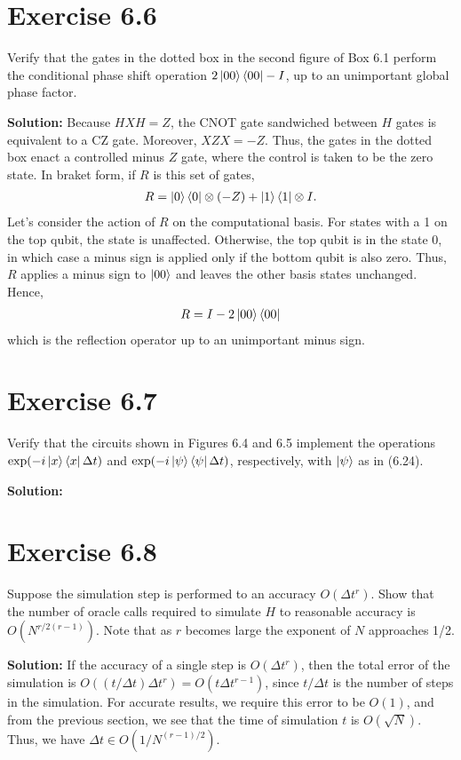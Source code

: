 \documentclass{book}
\begin{document}
    \section*{Exercise 6.6} 
        Verify that the gates in the dotted box in the second figure of Box 6.1 perform the conditional phase shift operation $2\ket{00}\bra{00}-I$, up to an unimportant global phase factor.
        
        \textbf{Solution:} Because $HXH = Z$, the CNOT gate sandwiched between $H$ gates is equivalent to a CZ gate. Moreover, $XZX = -Z$. Thus, the gates in the dotted box enact a controlled minus $Z$ gate, where the control is taken to be the zero state. In braket form, if $R$ is this set of gates,
        \begin{align}
            R = \ket{0}\bra{0} \otimes (-Z) + \ket{1}\bra{1}\otimes I.
        \end{align}
        Let's consider the action of $R$ on the computational basis. For states with a 1 on the top qubit, the state is unaffected. Otherwise, the top qubit is in the state 0, in which case a minus sign is applied only if the bottom qubit is also zero. Thus, $R$ applies a minus sign to $\ket{00}$ and leaves the other basis states unchanged. Hence,
        \begin{align}
            R = I - 2\ket{00}\bra{00}
        \end{align}
        which is the reflection operator up to an unimportant minus sign. 
    
    \section*{Exercise 6.7}
        Verify that the circuits shown in Figures 6.4 and 6.5 implement the operations $\exp(-i\ket{x}\bra{x}\Delta t)$ and $\exp(-i\ket{\psi}\bra{\psi}\Delta t)$, respectively, with $\ket{\psi}$ as in (6.24).
        
        \textbf{Solution:}
    
    \section*{Exercise 6.8}
        Suppose the simulation step is performed to an accuracy $O(\Delta t^r)$. Show that the number of oracle calls required to simulate $H$ to reasonable accuracy is $O(N^{r/2(r-1)})$. Note that as $r$ becomes large the exponent of $N$ approaches 1/2.
        
        \textbf{Solution:} If the accuracy of a single step is $O(\Delta t^r)$, then the total error of the simulation is $O((t/\Delta t) \Delta t^r)=O(t\Delta t^{r-1})$, since $t/\Delta t$ is the number of steps in the simulation. For accurate results, we require this error to be $O(1)$, and from the previous section, we see that the time of simulation $t$ is $O(\sqrt{N})$. Thus, we have $\Delta t \in O(1/N^{(r-1)/2})$. 
    
\end{document}
